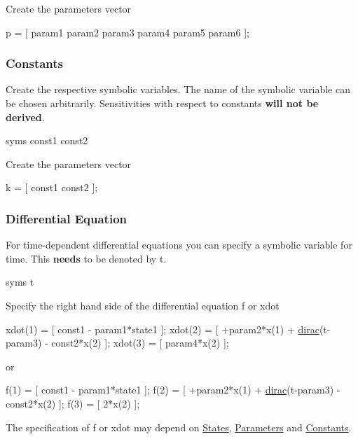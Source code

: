 Create the parameters vector


\begin{DoxyCode}
p = [ param1 param2 param3 param4 param5 param6 ]; 
\end{DoxyCode}
\hypertarget{def_simu_constants}{}\subsubsection{Constants}\label{def_simu_constants}
Create the respective symbolic variables. The name of the symbolic variable can be chosen arbitrarily. Sensitivities with respect to constants {\bfseries will not be derived}.


\begin{DoxyCode}
syms const1 const2 
\end{DoxyCode}


Create the parameters vector


\begin{DoxyCode}
k = [ const1 const2 ]; 
\end{DoxyCode}
\hypertarget{def_simu_rhs}{}\subsubsection{Differential Equation}\label{def_simu_rhs}
For time-\/dependent differential equations you can specify a symbolic variable for time. This {\bfseries needs} to be denoted by t.


\begin{DoxyCode}
syms t 
\end{DoxyCode}


Specify the right hand side of the differential equation f or xdot


\begin{DoxyCode}
xdot(1) = [ const1 - param1*state1 ];
xdot(2) = [ +param2*x(1) + \hyperlink{symbolic__functions_8c_a30a33546875b9dd1a63c29312b316f7e}{dirac}(t-param3) - const2*x(2) ];
xdot(3) = [ param4*x(2) ];
\end{DoxyCode}


or


\begin{DoxyCode}
f(1) = [ const1 - param1*state1 ];
f(2) = [ +param2*x(1) + \hyperlink{symbolic__functions_8c_a30a33546875b9dd1a63c29312b316f7e}{dirac}(t-param3) - const2*x(2) ];
f(3) = [ 2*x(2) ];
\end{DoxyCode}


The specification of f or xdot may depend on \hyperlink{def_simu_states}{States}, \hyperlink{def_simu_parameters}{Parameters} and \hyperlink{def_simu_constants}{Constants}.

